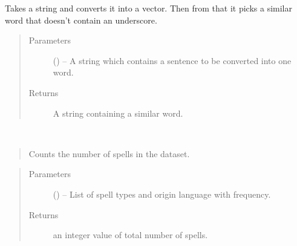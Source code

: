 \documentclass[letterpaper,10pt,english]{sphinxmanual}
\begin{document}
\begin{fulllineitems}
\label{code:hp_spells.sentenceToWord}
Takes a string and converts it into a vector. Then from that it picks a similar word that doesn't contain an underscore.
\begin{quote}\begin{description}
\item[{Parameters}] \leavevmode
{} () -- A string which contains a sentence to be converted into one word.

\item[{Returns}] \leavevmode
A string containing a similar word.

\end{description}\end{quote}

\end{fulllineitems}


\begin{fulllineitems}
\label{code:hp_spells.totalSpells}~\begin{quote}

Counts the number of spells in the dataset.
\end{quote}
\begin{quote}\begin{description}
\item[{Parameters}] \leavevmode
{} (\sphinxstyleliteralemphasis{}\sphinxstyleliteralemphasis{{[}}\sphinxstyleliteralemphasis{}\sphinxstyleliteralemphasis{{[}}\sphinxstyleliteralemphasis{}\sphinxstyleliteralemphasis{{[}}\sphinxstyleliteralemphasis{,}\sphinxstyleliteralemphasis{{]}}\sphinxstyleliteralemphasis{}\sphinxstyleliteralemphasis{, }\sphinxstyleliteralemphasis{{]}}\sphinxstyleliteralemphasis{{]}}\sphinxstyleliteralemphasis{}) -- List of spell types and origin language with frequency.

\item[{Returns}] \leavevmode
an integer value of total number of spells.

\end{description}\end{quote}

\end{fulllineitems}
\end{document}
